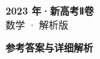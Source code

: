 \documentclass[zihao=-4, a4paper]{ctexart}
\begin{document}
\begin{center}
  {\Large\bfseries 2023 年·新高考Ⅱ卷}\\[4pt]
  {\large 数学 · 解析版}
\end{center}
\medskip
{}

\clearpage
{}
\begin{center}{\Large\bfseries 参考答案与详细解析}\end{center}
\medskip

\end{document}
